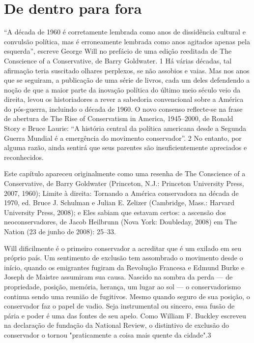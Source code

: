 \chapter{De dentro para fora}\label{De dentro para fora}
 \par 
“A década de 1960 é corretamente lembrada como anos de dissidência cultural e convulsão política, mas é erroneamente lembrada como anos agitados apenas pela esquerda”, escreve George Will no prefácio de uma edição reeditada de The Conscience of a Conservative, de Barry Goldwater. {\color{blue}1} Há várias décadas, tal afirmação teria suscitado olhares perplexos, se não assobios e vaias. Mas nos anos que se seguiram, a publicação de uma série de livros, cada um deles defendendo a noção de que a maior parte da inovação política do último meio século veio da direita, levou os historiadores a rever a sabedoria convencional sobre a América do pós-guerra, incluindo o década de 1960. O novo consenso reflecte-se na frase de abertura de The Rise of Conservatism in America, 1945–2000, de Ronald Story e Bruce Laurie: “A história central da política americana desde a Segunda Guerra Mundial é a emergência do movimento conservador”. {\color{blue}2} No entanto, por alguma razão, ainda sentirá que seus parentes são insuficientemente apreciados e reconhecidos.
 \par 
Este capítulo apareceu originalmente como uma resenha de The Conscience of a Conservative, de Barry Goldwater (Princeton, N.J.: Princeton University Press, 2007, 1960); Limite à direita: Tornando a América conservadora na década de 1970, ed. Bruce J. Schulman e Julian E. Zelizer (Cambridge, Mass.: Harvard University Press, 2008); e Eles sabiam que estavam certos: a ascensão dos neoconservadores, de Jacob Heilbrunn (Nova York: Doubleday, 2008) em The Nation (23 de junho de 2008): 25–33.
 \par 
Will dificilmente é o primeiro conservador a acreditar que é um exilado em seu próprio país. Um sentimento de exclusão tem assombrado o movimento desde o início, quando os emigrantes fugiram da Revolução Francesa e Edmund Burke e Joseph de Maistre assumiram sua causa. Nascido na sombra da perda — de propriedade, posição, memória, herança, um lugar ao sol — o conservadorismo continua sendo uma reunião de fugitivos. Mesmo quando seguro de sua posição, o conservador faz o papel de vadio. Seja instrumental ou sincero, essa fusão de pária e poder é uma das fontes de seu apelo. Como William F. Buckley escreveu na declaração de fundação da National Review, o distintivo de exclusão do conservador o tornou "praticamente a coisa mais quente da cidade".{\color{blue}3}
